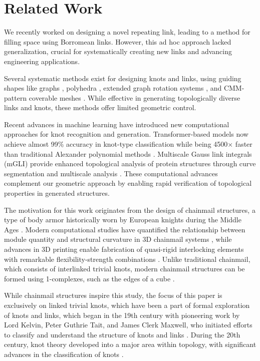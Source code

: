 \documentclass[times,twocolumn,final]{elsarticle}
\begin{document}
\section{Related Work} 

We recently worked on designing a novel repeating link, leading to a method for filling space using Borromean links. However, this ad hoc approach lacked generalization, crucial for systematically creating new links and advancing engineering applications.

Several systematic methods exist for designing knots and links, using guiding shapes like graphs \cite{tait1877knots, tait1877links}, polyhedra \cite{roelofs2007rings,sequin2021polyhedral,lipschutz2022linkedknots,gailiunas2022tplinks}, extended graph rotation systems \cite{akleman2020topologically, akleman2015extended}, and CMM-pattern coverable meshes \cite{akleman2015block}. While effective in generating topologically diverse links and knots, these methods offer limited geometric control.

Recent advances in machine learning have introduced new computational approaches for knot recognition and generation. Transformer-based models now achieve almost 99\% accuracy in knot-type classification while being 4500× faster than traditional Alexander polynomial methods \cite{zhang2025recognizing}. Multiscale Gauss link integrals (mGLI) provide enhanced topological analysis of protein structures through curve segmentation and multiscale analysis \cite{shen2023knot}. These computational advances complement our geometric approach by enabling rapid verification of topological properties in generated structures.

The motivation for this work originates from the design of chainmail structures, a type of body armor historically worn by European knights during the Middle Ages \cite{grancsay1928notes}. Modern computational studies have quantified the relationship between module quantity and structural curvature in 3D chainmail systems \cite{afif2024influence}, while advances in 3D printing enable fabrication of quasi-rigid interlocking elements with remarkable flexibility-strength combinations \cite{tang2023chainmail}. Unlike traditional chainmail, which consists of interlinked trivial knots, modern chainmail structures can be formed using 1-complexes, such as the edges of a cube \cite{afif2024chain,wang2021structured,xu2023study}.

While chainmail structures inspire this study, the focus of this paper is exclusively on linked trivial knots, which have been a part of formal exploration of knots and links, which began in the 19th century with pioneering work by Lord Kelvin, Peter Guthrie Tait, and James Clerk Maxwell, who initiated efforts to classify and understand the structure of knots and links \cite{tait1877links,tait1877knots}. During the 20th century, knot theory developed into a major area within topology, with significant advances in the classification of knots \cite{conway1970enumeration,neuwirth1979theory}.
\end{document}
